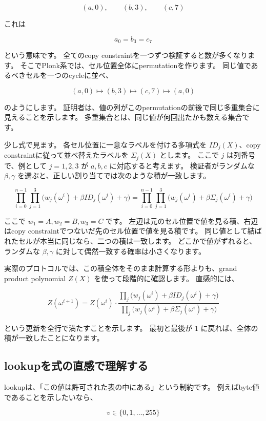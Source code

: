 \documentclass[a4paper,11pt]{ltjsarticle}
\begin{document}
\[
  (a,0),\qquad (b,3),\qquad (c,7)
\]

これは

\[
  a_0=b_3=c_7
\]

という意味です。
全てのcopy constraintを一つずつ検証すると数が多くなります。
そこでPlonk系では、セル位置全体にpermutationを作ります。
同じ値であるべきセルを一つのcycleに並べ、

\[
  (a,0)\mapsto (b,3)\mapsto (c,7)\mapsto (a,0)
\]

のようにします。
証明者は、値の列がこのpermutationの前後で同じ多重集合に見えることを示します。
多重集合とは、同じ値が何回出たかも数える集合です。

少し式で見ます。
各セル位置に一意なラベルを付ける多項式を \(ID_j(X)\)、copy constraintに従って並べ替えたラベルを \(\Sigma_j(X)\) とします。
ここで \(j\) は列番号で、例として \(j=1,2,3\) が \(a,b,c\) に対応すると考えます。
検証者がランダムな \(\beta,\gamma\) を選ぶと、正しい割り当てでは次のような積が一致します。

\[
  \prod_{i=0}^{n-1}\prod_{j=1}^{3}
  \bigl(w_j(\omega^i)+\beta ID_j(\omega^i)+\gamma\bigr)
  =
  \prod_{i=0}^{n-1}\prod_{j=1}^{3}
  \bigl(w_j(\omega^i)+\beta \Sigma_j(\omega^i)+\gamma\bigr)
\]

ここで \(w_1=A,w_2=B,w_3=C\) です。
左辺は元のセル位置で値を見る積、右辺はcopy constraintでつないだ先のセル位置で値を見る積です。
同じ値として結ばれたセルが本当に同じなら、二つの積は一致します。
どこかで値がずれると、ランダムな \(\beta,\gamma\) に対して偶然一致する確率は小さくなります。

実際のプロトコルでは、この積全体をそのまま計算する形よりも、grand product polynomial \(Z(X)\) を使って段階的に確認します。
直感的には、

\[
  Z(\omega^{i+1})
  =
  Z(\omega^i)
  \cdot
  \frac{
    \prod_j\bigl(w_j(\omega^i)+\beta ID_j(\omega^i)+\gamma\bigr)
  }{
    \prod_j\bigl(w_j(\omega^i)+\beta \Sigma_j(\omega^i)+\gamma\bigr)
  }
\]

という更新を全行で満たすことを示します。
最初と最後が \(1\) に戻れば、全体の積が一致したことになります。

\subsection{lookupを式の直感で理解する}

lookupは、「この値は許可された表の中にある」という制約です。
例えばbyte値であることを示したいなら、

\[
  v \in \{0,1,\ldots,255\}
\]
\end{document}
